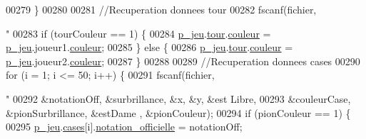 \begin{DoxyCode}
{{{{{{{{{00279                 \}
00280 
00281                 \textcolor{comment}{//Recuperation donnees tour}
00282                 fscanf(fichier, \textcolor{stringliteral}{"%
00283                 \textcolor{keywordflow}{if} (tourCouleur == 1) \{
00284                         \hyperlink{moteur_8h_a3efa8d0f7c65daedc584dc8db048e62c}{p_jeu}.\hyperlink{structplateau_ab38c06b0c7e61b9eeb63b04c5e5bc652}{tour}.\hyperlink{structjoueur_a057f95a41503a890f27c651969ffac8d}{couleur} = \hyperlink{moteur_8h_a3efa8d0f7c65daedc584dc8db048e62c}{p_jeu}.joueur1.\hyperlink{structjoueur_a057f95a41503a890f27c651969ffac8d}{couleur};
00285                 \} \textcolor{keywordflow}{else} \{
00286                         \hyperlink{moteur_8h_a3efa8d0f7c65daedc584dc8db048e62c}{p_jeu}.\hyperlink{structplateau_ab38c06b0c7e61b9eeb63b04c5e5bc652}{tour}.\hyperlink{structjoueur_a057f95a41503a890f27c651969ffac8d}{couleur} = \hyperlink{moteur_8h_a3efa8d0f7c65daedc584dc8db048e62c}{p_jeu}.joueur2.\hyperlink{structjoueur_a057f95a41503a890f27c651969ffac8d}{couleur};
00287                 \}
00288 
00289                 \textcolor{comment}{//Recuperation donnees cases}
00290                 \textcolor{keywordflow}{for} (i = 1; i <= 50; i++) \{
00291                         fscanf(fichier, \textcolor{stringliteral}{"%
00292                                         &notationOff, &surbrillance, &x, &y, &est
      Libre,
00293                                         &couleurCase, &pionSurbrillance, &estDame
      , &pionCouleur);
00294                         \textcolor{keywordflow}{if} (pionCouleur == 1) \{
00295                                 \hyperlink{moteur_8h_a3efa8d0f7c65daedc584dc8db048e62c}{p_jeu}.\hyperlink{structplateau_a6afaa60f594542e0d742b0c6d3223392}{cases}[i].\hyperlink{structcase__plateau_ad510581b324604a9cf685cbb769a421a}{notation_officielle} = notationOff;
      
}}}}}}}}}}}
\end{DoxyCode}
